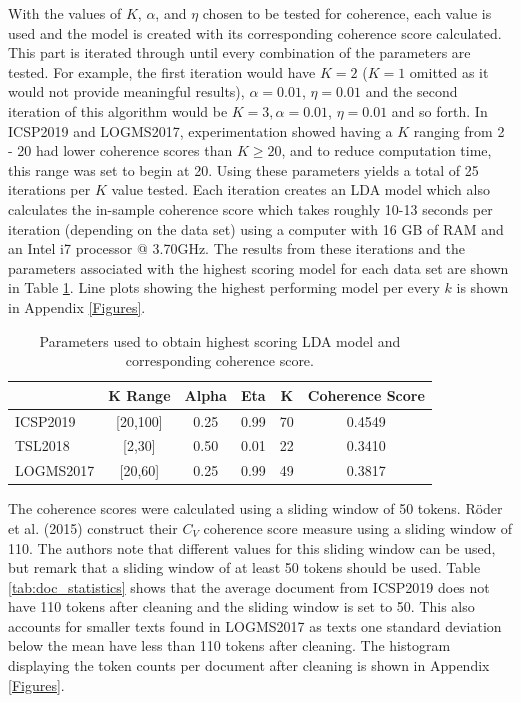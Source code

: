 \documentclass[a4paper, 12pt, twoside]{article}
\numberwithin{equation}{section} %
\begin{document}
With the values of $K$, $\alpha$, and $\eta$ chosen to be tested for coherence, each value is used and the model is created with its corresponding coherence score calculated. This part is iterated through until every combination of the parameters are tested. For example, the first iteration would have $K = 2$ ($K = 1$ omitted as it would not provide meaningful results), $\alpha = 0.01$, $\eta = 0.01$ and the second iteration of this algorithm would be $K = 3, \alpha = 0.01$, $\eta = 0.01$ and so forth. In ICSP2019 and LOGMS2017, experimentation showed having a $K$ ranging from 2 - 20 had lower coherence scores than $K \ge 20$, and to reduce computation time, this range was set to begin at 20. Using these parameters yields a total of 25 iterations per $K$ value tested. Each iteration creates an LDA model which also calculates the in-sample coherence score which takes roughly 10-13 seconds per iteration (depending on the data set) using a computer with 16 GB of RAM and an Intel i7 processor @ 3.70GHz. The results from these iterations and the parameters associated with the highest scoring model for each data set are shown in Table \ref{tab:varied K parameter_table}. Line plots showing the highest performing model per every $k$ is shown in Appendix \ref{Figures}. 


\begin{table}[H]
\centering
\begin{tabular}{@{}lccccc@{}}
\toprule
          & K Range      & Alpha & Eta  & K  & Coherence Score \\ \midrule
ICSP2019  & {[}20,100{]} & 0.25  & 0.99 & 70 & 0.4549          \\
TSL2018   & {[}2,30{]}   & 0.50  & 0.01 & 22 & 0.3410          \\
LOGMS2017 & {[}20,60{]}  & 0.25  & 0.99 & 49 & 0.3817          \\ \bottomrule
\end{tabular}
\caption[Parameters from LDA models]{Parameters used to obtain highest scoring LDA model and corresponding coherence score.}
\label{tab:varied K parameter_table}
\end{table}

The coherence scores were calculated using a sliding window of 50 tokens. Röder et al. (2015) construct their $C_V$ coherence score measure using a sliding window of 110. The authors note that different values for this sliding window can be used, but remark that a sliding window of at least 50 tokens should be used. Table \ref{tab:doc_statistics} shows that the average document from ICSP2019 does not have 110 tokens after cleaning and the sliding window is set to 50. This also accounts for smaller texts found in LOGMS2017 as texts one standard deviation below the mean have less than 110 tokens after cleaning. The histogram displaying the token counts per document after cleaning is shown in Appendix \ref{Figures}.
\end{document}
